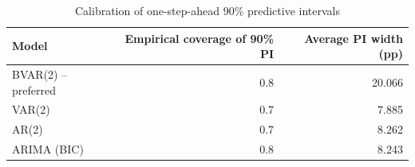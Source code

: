 \begin{table}

\caption{\label{tab:forecast-coverage}Calibration of one-step-ahead 90\% predictive intervals}
\centering
\begin{tabular}[t]{lrr}
\toprule
Model & Empirical coverage of 90\% PI & Average PI width (pp)\\
\midrule
BVAR(2) -- preferred & 0.8 & 20.066\\
VAR(2) & 0.7 & 7.885\\
AR(2) & 0.7 & 8.262\\
ARIMA (BIC) & 0.8 & 8.243\\
\bottomrule
\end{tabular}
\end{table}
